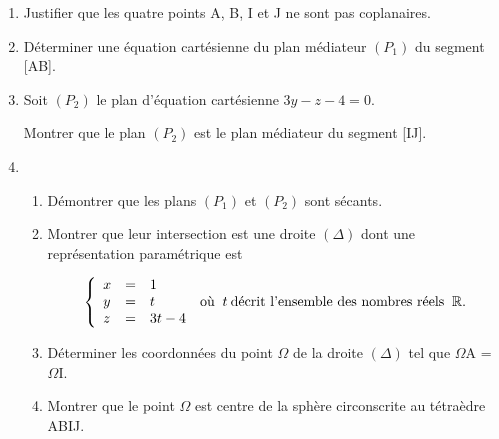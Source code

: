 \documentclass[10pt]{article}
\newcommand{\R}{\mathbb{R}}
\begin{document}
\begin{enumerate}
\item Justifier que les quatre points A, B, I et J ne sont pas coplanaires. 
\item Déterminer une équation cartésienne du plan médiateur 
$\left(P_{1}\right)$ du segment [AB]. 
\item Soit $\left(P_{2}\right)$ le plan d'équation cartésienne $3y - z - 4 = 0$. 

Montrer que le plan $\left(P_{2}\right)$ est le plan médiateur du segment [IJ]. 
\item  
	\begin{enumerate}
		\item Démontrer que les plans $\left(P_{1}\right)$ et $\left(P_{2}\right)$ sont sécants. 
		\item Montrer que leur intersection est une droite $(\Delta)$ dont une représentation paramétrique est 
 
\[\left\{\begin{array}{l c l}
x &=& 1\\ 
y &=& t\\
z &=& 3t - 4
\end{array}\right.\: \text{où }\: t\: \text{décrit l'ensemble des nombres réels } \:\R.\]
  
		\item Déterminer les coordonnées du point $\Omega$ de la droite $(\Delta)$ tel que $\Omega$A = $\Omega$I. 
		\item Montrer que le point $\Omega$ est centre de la sphère circonscrite au tétraèdre ABIJ. 
	\end{enumerate}
\end{enumerate}
\printindex
\end{document}
